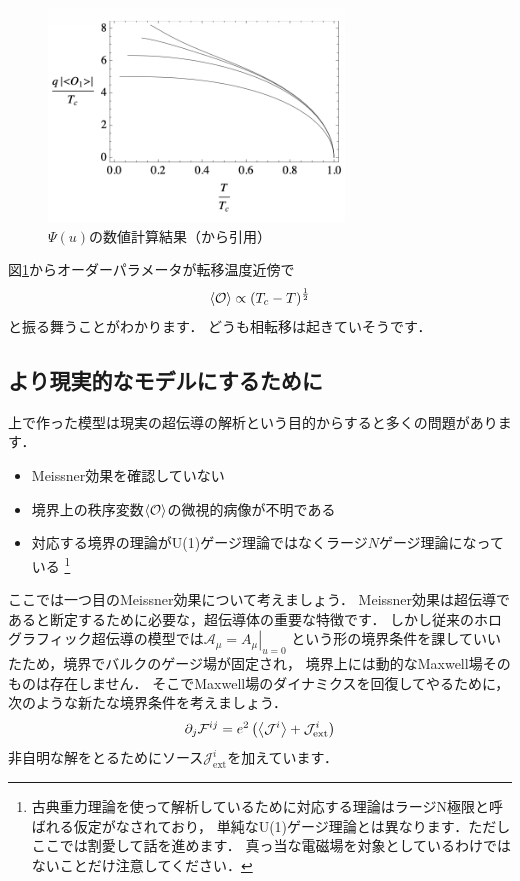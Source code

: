 \documentclass[b5paper,11pt,dvipdfmx]{jsarticle}
\numberwithin{equation}{section}
\theoremstyle{definition}
\begin{document}
\begin{figure}[t]
    \centering
    \includegraphics[width=0.7\textwidth]{fig_kawai/order_para.png}
    \caption{$\Psi(u)$の数値計算結果（\cite{Hartnoll08b}から引用）}
    \label{fig:order_para}
\end{figure}
図\ref{fig:order_para}からオーダーパラメータが転移温度近傍で
\begin{equation}
    \ev{\mathcal{O}} \propto (T_c - T)^{\frac{1}{2}}
\end{equation}
と振る舞うことがわかります．
どうも相転移は起きていそうです．


\subsection{より現実的なモデルにするために}
上で作った模型は現実の超伝導の解析という目的からすると多くの問題があります．
\begin{itemize}
    \item Meissner効果を確認していない
    \item 境界上の秩序変数$\ev{\mathcal{O}}$の微視的病像が不明である
    \item 対応する境界の理論がU(1)ゲージ理論ではなくラージ$N$ゲージ理論になっている
    \footnote{古典重力理論を使って解析しているために対応する理論はラージN極限と呼ばれる仮定がなされており，
    単純なU(1)ゲージ理論とは異なります．ただしここでは割愛して話を進めます．
    真っ当な電磁場を対象としているわけではないことだけ注意してください．}
\end{itemize}
ここでは一つ目のMeissner効果について考えましょう．
Meissner効果は超伝導であると断定するために必要な，超伝導体の重要な特徴です．
しかし従来のホログラフィック超伝導の模型では$\mathcal{A}_\mu = \left. A_\mu \right|_{u = 0}$
という形の境界条件を課していいたため，境界でバルクのゲージ場が固定され，
境界上には動的なMaxwell場そのものは存在しません．
そこでMaxwell場のダイナミクスを回復してやるために，次のような新たな境界条件を考えましょう．
\begin{equation}
    \partial_{j} \mathcal{F}^{ij}
    = e^{2} \left( \ev{\mathcal{J}^{i}} + \mathcal{J}_{\text{ext}}^i \right)
\end{equation}
非自明な解をとるためにソース$\mathcal{J}_{\text{ext}}^i$を加えています．
\end{document}
